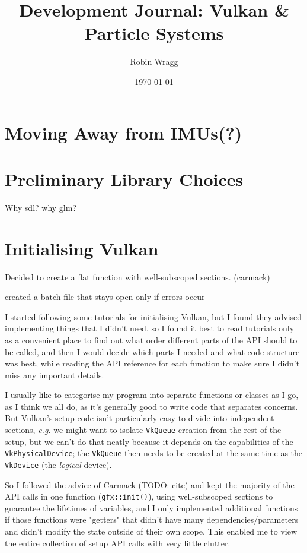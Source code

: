 \documentclass[11pt, a4paper, twocolumn]{article}
\title{\sffamily\bfseries Development Journal: Vulkan \& Particle Systems}
\author{Robin Wragg}
\date{\today}
\begin{document}
\maketitle

\section{Moving Away from IMUs(?)}

\section{Preliminary Library Choices}

Why sdl? why glm?

\section{Initialising Vulkan}

Decided to create a flat function with well-subscoped sections. (carmack)

created a batch file that stays open only if errors occur

I started following some tutorials for initialising Vulkan, but I found they advised implementing things that I didn't need, so I found it best to read tutorials only as a convenient place to find out what order different parts of the API should to be called, and then I would decide which parts I needed and what code structure was best, while reading the API reference for each function to make sure I didn't miss any important details.

I usually like to categorise my program into separate functions or classes as I go, as I think we all do, as it's generally good to write code that separates concerns. But Vulkan's setup code isn't particularly easy to divide into independent sections, \emph{e.g.} we might want to isolate \verb|VkQueue| creation from the rest of the setup, but we can't do that neatly because it depends on the capabilities of the \verb|VkPhysicalDevice|; the \verb|VkQueue| then needs to be created at the same time as the \verb|VkDevice| (the \emph{logical} device).

So I followed the advice of Carmack (TODO: cite) and kept the majority of the API calls in one function (\verb|gfx::init()|), using well-subscoped sections to guarantee the lifetimes of variables, and I only implemented additional functions if those functions were "getters" that didn't have many dependencies/parameters and didn't modify the state outside of their own scope. This enabled me to view the entire collection of setup API calls with very little clutter.





\end{document}
